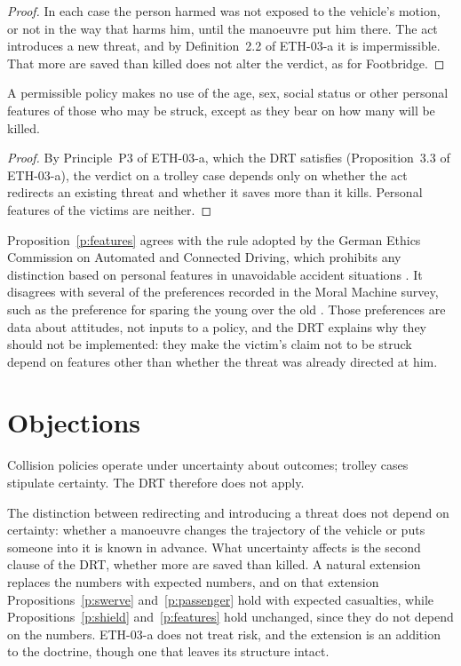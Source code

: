 \documentclass{situationist-preprint}
\begin{document}
\begin{proof}
In each case the person harmed was not exposed to the vehicle's motion, or not in the way that harms him, until the manoeuvre put him there. The act introduces a new threat, and by Definition~2.2 of ETH-03-a it is impermissible. That more are saved than killed does not alter the verdict, as for Footbridge.
\end{proof}

\begin{proposition}\label{p:features}
A permissible policy makes no use of the age, sex, social status or other personal features of those who may be struck, except as they bear on how many will be killed.
\end{proposition}

\begin{proof}
By Principle~P3 of ETH-03-a, which the DRT satisfies (Proposition~3.3 of ETH-03-a), the verdict on a trolley case depends only on whether the act redirects an existing threat and whether it saves more than it kills. Personal features of the victims are neither.
\end{proof}

Proposition~\ref{p:features} agrees with the rule adopted by the German Ethics Commission on Automated and Connected Driving, which prohibits any distinction based on personal features in unavoidable accident situations \citep{Ethik2017}. It disagrees with several of the preferences recorded in the Moral Machine survey, such as the preference for sparing the young over the old \citep{Awad2018}. Those preferences are data about attitudes, not inputs to a policy, and the DRT explains why they should not be implemented: they make the victim's claim not to be struck depend on features other than whether the threat was already directed at him.

\section{Objections}

\begin{objection}[Risk]
Collision policies operate under uncertainty about outcomes; trolley cases stipulate certainty. The DRT therefore does not apply.
\end{objection}

\begin{reply}
The distinction between redirecting and introducing a threat does not depend on certainty: whether a manoeuvre changes the trajectory of the vehicle or puts someone into it is known in advance. What uncertainty affects is the second clause of the DRT, whether more are saved than killed. A natural extension replaces the numbers with expected numbers, and on that extension Propositions~\ref{p:swerve} and~\ref{p:passenger} hold with expected casualties, while Propositions~\ref{p:shield} and~\ref{p:features} hold unchanged, since they do not depend on the numbers. ETH-03-a does not treat risk, and the extension is an addition to the doctrine, though one that leaves its structure intact.
\end{reply}
\end{document}
